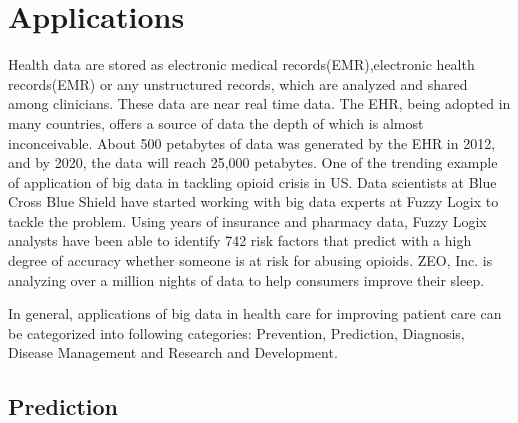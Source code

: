 \documentclass[sigconf]{acmart}
\begin{document}
\section{Applications}

Health data are stored as electronic medical records(EMR),electronic health records(EMR) or any unstructured records, which are
analyzed and shared among clinicians. These data are near real time data. The EHR, being adopted in many countries, offers a 
source of data the depth of which is almost inconceivable. About 500 petabytes of data was generated by the EHR in 2012, 
and by 2020, the data will reach 25,000 petabytes\cite{www-ghdonline-org}. One of the trending example of application of big 
data in tackling opioid crisis in US.
Data scientists at Blue Cross Blue Shield have started working with big data experts at Fuzzy Logix to tackle the problem. 
Using years of insurance and pharmacy data, Fuzzy Logix analysts have been able to identify 742 risk factors that predict 
with a high degree of accuracy whether someone is at risk for abusing opioids\cite{www-datapine-com}. ZEO, Inc. is 
analyzing over a million nights of data to help consumers improve their sleep\cite{www-ghdonline-org}.

In general, applications of big data in health care for improving patient care can be categorized 
into following categories: Prevention, Prediction, Diagnosis, Disease Management and Research and Development.

\subsection{Prediction}
\end{document}

